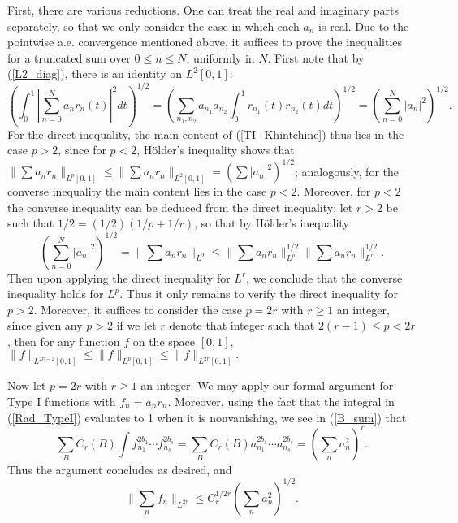 \documentclass[oneside,11pt]{amsart}
\begin{document}
First, there are various reductions. One can treat the real and imaginary parts separately, so that  we only consider the case in which each $a_n$ is real. Due to the pointwise a.e. convergence mentioned above, it suffices to prove the inequalities for a truncated sum over $0 \leq n \leq N$, uniformly in $N$. 
First note that by (\ref{L2_diag}),  there is an identity on $L^2[0,1]$:  
\[( \int_0^1| \sum_{n=0}^N a_n r_n(t) |^2 dt )^{1/2}=( \sum_{n_1,n_2} a_{n_1} a_{n_2} \int_0^1 r_{n_1}(t) r_{n_2}(t)   dt )^{1/2} 
	=  (\sum_{n=0}^N |a_n|^2)^{1/2}.
\]
For the direct inequality, the main content of (\ref{TI_Khintchine}) thus lies in the case $p>2$, since for $p<2$, H\"older's inequality  shows that $\| \sum a_n r_n \|_{L^p[0,1]} \leq \| \sum a_n r_n \|_{L^2[0,1]} = (\sum |a_n|^2)^{1/2}$; analogously, for the converse inequality the main content lies in the case $p<2$. 
Moreover, for $p<2$ the converse inequality can be deduced from the direct inequality:  let $r>2$ be such that $1/2 = (1/2) (1/p + 1/r)$, so that by H\"older's inequality 
\[ (\sum_{n=0}^N |a_n|^2)^{1/2} = \| \sum a_n r_n \|_{L^2} \leq \|\sum a_n r_n \|_{L^p}^{1/2}   \|\sum a_n r_n \|^{1/2}_{L^r} .
\]
Then upon applying the direct inequality for $L^r$, we conclude that the converse inequality holds for $L^p$. 
Thus it only remains to verify the direct inequality for $p >2$. Moreover, it suffices to consider the case   $p=2r$ with $r \geq 1$ an integer, since given any $p>2$ if we let $r$ denote that integer such that $2(r-1) \leq p < 2r$, then for any function $f$ on the space $[0,1]$, $\| f\|_{L^{2r-2}[0,1]} \leq \|f\|_{L^p[0,1]} \leq \|f\|_{L^{2r}[0,1]}.$

Now let $p=2r$ with $r\geq 1$ an integer.
We may apply our formal argument for Type I functions with $f_n = a_n r_n$. Moreover, using the fact that the integral in (\ref{Rad_TypeI}) evaluates to 1 when it is nonvanishing, we see in (\ref{B_sum}) that 
\[ \sum_B C_r(B) \int f_{n_1}^{2b_1} \cdots f_{n_s}^{2b_s} = \sum_B C_r(B) a_{n_1}^{2b_1} \cdots a_{n_s}^{2b_s} 
	 = (\sum_{n} a_n^2)^r.
\]
Thus the argument concludes  as desired, and
\[ \| \sum_{n  } f_n \|_{L^{2r}}  \leq C_r^{1/2r} ( \sum_n a_n^2)^{1/2}.\]
 
\end{document}

